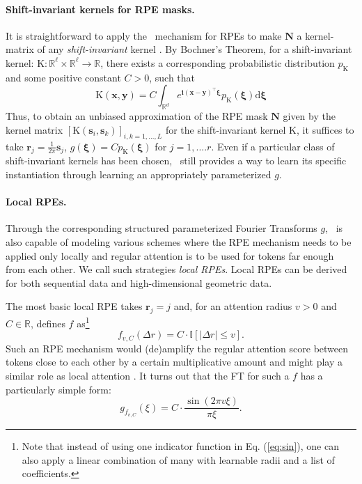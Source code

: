 \paragraph{Shift-invariant kernels for RPE masks.} It is straightforward to apply the \FLT~mechanism for RPEs to make $\mathbf{N}$ a kernel-matrix of any \textit{shift-invariant} kernel \cite{rahimi}. By Bochner's Theorem, for a shift-invariant kernel: $\mathrm{K}: \mathbb{R}^{\ell} \times \mathbb{R}^{\ell}  \rightarrow \mathbb{R}$, there exists a corresponding probabilistic distribution $p_{\mathrm{K}}$ and some positive constant $C>0$, such that
\begin{equation*}
\mathrm{K}(\mathbf{x},\mathbf{y}) = C\int_{\mathbb{R}^{d}} e^{\mathbf{i}(\mathbf{x}-\mathbf{y})^{\top}\boldsymbol{\xi}}p_{\mathrm{K}}(\boldsymbol{\xi})\mathrm{d}\boldsymbol{\xi}
\end{equation*}
Thus, to obtain an unbiased approximation of the RPE mask $\mathbf{N}$ given by the kernel matrix $[\mathrm{K}(\mathbf{s}_{i},\mathbf{s}_{k})]_{i,k=1,...,L}$ for the shift-invariant kernel $\mathrm{K}$, it suffices to take $\mathbf{r}_{j}=\frac{1}{2\pi}\mathbf{s}_{j}$,  
$g(\boldsymbol{\xi})=Cp_{\mathrm{K}}(\boldsymbol{\xi})$ for $j=1,....r$. Even if a particular class of
shift-invariant kernels has been chosen, \FLT~still provides a way to learn its specific instantiation through learning an appropriately parameterized $g$. 

\paragraph{Local RPEs.} Through the corresponding structured parameterized Fourier Transforms $g$, \FLT~is also capable of modeling various schemes where the RPE mechanism needs to be applied only locally and regular attention is to be used for tokens far enough from each other. We call such strategies \textit{local RPEs}. Local RPEs can be derived for both sequential data and high-dimensional geometric data.

The most basic local RPE takes $\mathbf{r}_{j}=j$ and, for an attention radius $v>0$ and $C \in \mathbb{R}$, defines $f$ as\footnote{Note that instead of using one indicator function in Eq. (\ref{eq:sin}), one can also apply a linear combination of many with learnable radii and a list of coefficients.}
\begin{equation}
\label{eq:sin}
f_{v, C}(\Delta r) = C \cdot \mathbb{I} [|\Delta r| \leq v].
\end{equation}
Such an RPE mechanism would (de)amplify the regular attention score between tokens close to each other by a certain multiplicative amount and might play a similar role as local attention \cite{local_attention}. It turns out that the FT for such a $f$ has a particularly simple form:
$$
g_{f_{v, C}}(\xi) = C \cdot \frac{\sin(2\pi v\xi)}{\pi \xi}.
$$

